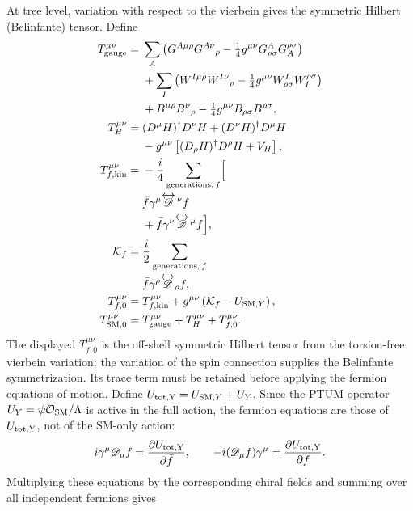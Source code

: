 \documentclass[epj]{svjour}
\begin{document}
At tree level, variation with respect to the vierbein gives the
symmetric Hilbert (Belinfante) tensor. Define
\begin{align}
T_{\rm gauge}^{\mu\nu}={}&
\sum_A\left(G^{A\mu\rho}G^{A\nu}{}_\rho
-\tfrac14g^{\mu\nu}G_{\rho\sigma}^AG_A^{\rho\sigma}\right)
\nonumber\\
&+\sum_I\left(W^{I\mu\rho}W^{I\nu}{}_\rho
-\tfrac14g^{\mu\nu}W_{\rho\sigma}^IW_I^{\rho\sigma}\right)
\nonumber\\
&+B^{\mu\rho}B^\nu{}_\rho
-\tfrac14g^{\mu\nu}B_{\rho\sigma}B^{\rho\sigma},\nonumber\\
T_H^{\mu\nu}={}&
(D^\mu H)^\dagger D^\nu H
+(D^\nu H)^\dagger D^\mu H\nonumber\\
&-g^{\mu\nu}\left[(D_\rho H)^\dagger D^\rho H+V_H\right],
\nonumber\\
T_{f,\mathrm{kin}}^{\mu\nu}={}&
-\frac{i}{4}\sum_{\text{generations},\,f}\Bigl[\nonumber\\
&\bar f\gamma^\mu\overleftrightarrow{\mathscr D}^{\,\nu}f
\nonumber\\
&+\bar f\gamma^\nu\overleftrightarrow{\mathscr D}^{\,\mu}f
\Bigr],\nonumber\\
\mathcal K_f={}&
\frac{i}{2}\sum_{\text{generations},\,f}\nonumber\\
&\bar f\gamma^\rho\overleftrightarrow{\mathscr D}_{\rho}f,\nonumber\\
T_{f,0}^{\mu\nu}={}&
T_{f,\mathrm{kin}}^{\mu\nu}
+g^{\mu\nu}\left(\mathcal K_f-U_{{\rm SM},Y}\right),\nonumber\\
T_{{\rm SM},0}^{\mu\nu}={}&
T_{\rm gauge}^{\mu\nu}+T_H^{\mu\nu}+T_{f,0}^{\mu\nu}.
\label{eq:sm_hilbert_tensor}
\end{align}
The displayed \(T_{f,0}^{\mu\nu}\) is the off-shell symmetric
Hilbert tensor from the torsion-free vierbein variation; the
variation of the spin connection supplies the Belinfante
symmetrization. Its trace term must be retained before applying
the fermion equations of motion. Define
\(U_{\rm tot,Y}=U_{{\rm SM},Y}+U_Y\). Since the PTUM operator
\(U_Y=\psi\mathcal O_{\rm SM}/\Lambda\) is active in the full
action, the fermion equations are those of \(U_{\rm tot,Y}\), not
of the SM-only action:
\begin{equation}
i\gamma^\mu\mathscr D_\mu f
=\frac{\partial U_{\rm tot,Y}}{\partial\bar f},
\qquad
-i(\mathscr D_\mu\bar f)\gamma^\mu
=\frac{\partial U_{\rm tot,Y}}{\partial f}.
\end{equation}
Multiplying these equations by the corresponding chiral fields
and summing over all independent fermions gives
\end{document}
